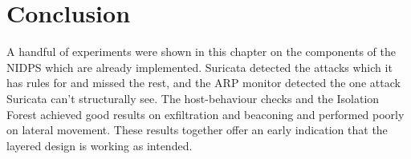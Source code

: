 \section{Conclusion}\label{sec:9.6}

\noindent A handful of experiments were shown in this chapter on the components of the NIDPS which are already implemented. Suricata detected the attacks which it has rules for and missed the rest, and the ARP monitor detected the one attack Suricata can't structurally see. The host-behaviour checks and the Isolation Forest achieved good results on exfiltration and beaconing and performed poorly on lateral movement. These results together offer an early indication that the layered design is working as intended.
